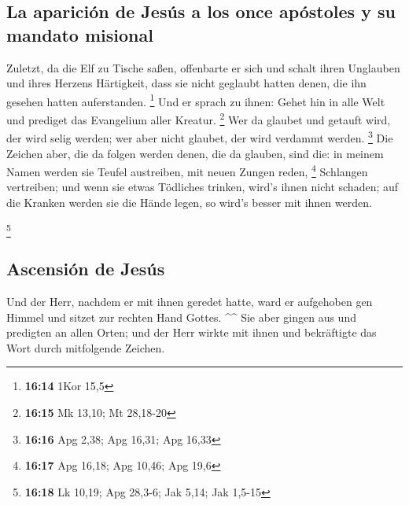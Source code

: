 \hypertarget{la-apariciuxf3n-de-jesuxfas-a-los-once-apuxf3stoles-y-su-mandato-misional}{%
\subsection{La aparición de Jesús a los once apóstoles y su mandato
misional}\label{la-apariciuxf3n-de-jesuxfas-a-los-once-apuxf3stoles-y-su-mandato-misional}}

 Zuletzt, da die Elf zu Tische saßen, offenbarte er sich
und schalt ihren Unglauben und ihres Herzens Härtigkeit, dass sie nicht
geglaubt hatten denen, die ihn gesehen hatten auferstanden. \footnote{\textbf{16:14}
  1Kor 15,5}  Und er sprach zu ihnen: Gehet hin in alle
Welt und prediget das Evangelium aller Kreatur. \footnote{\textbf{16:15}
  Mk 13,10; Mt 28,18-20}  Wer da glaubet und getauft
wird, der wird selig werden; wer aber nicht glaubet, der wird verdammt
werden. \footnote{\textbf{16:16} Apg 2,38; Apg 16,31; Apg 16,33}
 Die Zeichen aber, die da folgen werden denen, die da
glauben, sind die: in meinem Namen werden sie Teufel austreiben, mit
neuen Zungen reden, \footnote{\textbf{16:17} Apg 16,18; Apg 10,46; Apg
  19,6}  Schlangen vertreiben; und wenn sie etwas
Tödliches trinken, wird's ihnen nicht schaden; auf die Kranken werden
sie die Hände legen, so wird's besser mit ihnen werden.

\footnote{\textbf{16:18} Lk 10,19; Apg 28,3-6; Jak 5,14; Jak 1,5-15}

\hypertarget{ascensiuxf3n-de-jesuxfas}{%
\subsection{Ascensión de Jesús}\label{ascensiuxf3n-de-jesuxfas}}

 Und der Herr, nachdem er mit ihnen geredet hatte, ward
er aufgehoben gen Himmel und sitzet zur rechten Hand Gottes. \^{}\^{}
 Sie aber gingen aus und predigten an allen Orten; und
der Herr wirkte mit ihnen und bekräftigte das Wort durch mitfolgende
Zeichen.
